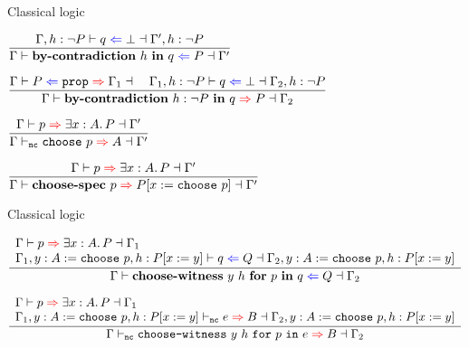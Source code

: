 \begin{frame}{Classical logic}

\begin{center}
  $\infrule{\checkproof{\assume{\Gamma}{h}{\Not{P}}}{q}{\False}{\assume{\Gamma'}{h}{\Not{P}}}}{\checkproof{\Gamma}{\bycontradiction{h}{q}}{P}{\Gamma'}}$

  \vspace{2em}

  $\infrule{\checkprop{\Gamma}{P}{\Gamma_1} \quad \checkproof{\assume{\Gamma_1}{h}{\Not{P}}}{q}{\False}{\assume{\Gamma_2}{h}{\Not{P}}}}{\inferproof{\Gamma}{\bycontradiction{h}[P]{q}}{P}{\Gamma_2}}$

  \vspace{2em}

  $\infrule{\inferproof{\Gamma}{p}{\Ex{x}[A]{P}}{\Gamma'}}{\infertype{\Gamma}[\noncomputable]{\choose{p}}{A}{\Gamma'}}$

  \vspace{2em}

  $\infrule{\inferproof{\Gamma}{p}{\Ex{x}[A]{P}}{\Gamma'}}{\inferproof{\Gamma}{\choosespec{p}}{\subst{P}{x}{\choose{p}}}{\Gamma'}}$
\end{center}

\end{frame}

\begin{frame}{Classical logic}

\begin{center}
  $\infrule{\begin{array}{l} \inferproof{\Gamma}{p}{\Ex{x}[A]{P}}{\Gamma_1} \\ \checkproof{\assume{\extend{\Gamma_1}{y}{A}[\choose{p}]}{h}{\subst{P}{x}{y}}}{q}{Q}{\assume{\extend{\Gamma_2}{y}{A}[\choose{p}]}{h}{\subst{P}{x}{y}}} \end{array}}{\checkproof{\Gamma}{\choosewitnessl{y}{h}{p}{q}}{Q}{\Gamma_2}}$

  \vspace{2em}

  $\infrule{\begin{array}{l} \inferproof{\Gamma}{p}{\Ex{x}[A]{P}}{\Gamma_1} \\ \infertype{\assume{\extend{\Gamma_1}{y}{A}[\choose{p}]}{h}{\subst{P}{x}{y}}}[\noncomputable]{e}{B}{\assume{\extend{\Gamma_2}{y}{A}[\choose{p}]}{h}{\subst{P}{x}{y}}} \end{array}}{\infertype{\Gamma}[\noncomputable]{\choosewitnessp{y}{h}{p}{e}}{B}{\Gamma_2}}$
\end{center}

\end{frame}